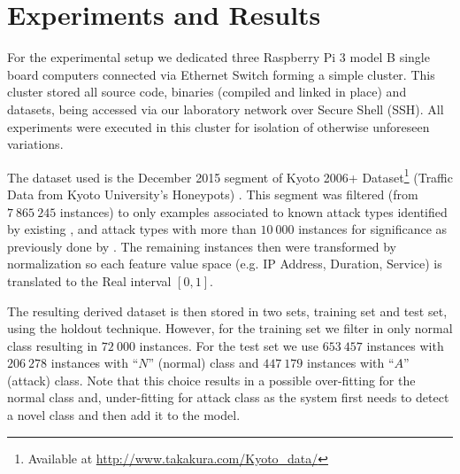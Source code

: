
\section{Experiments and Results}
\label{sec:experiments}

For the experimental setup we dedicated three Raspberry Pi 3 model B single
board computers connected via Ethernet Switch forming a simple cluster.
This cluster stored all source code, binaries (compiled and linked in place) and
datasets, being accessed via our laboratory network over Secure Shell (SSH).
All experiments were executed in this cluster for isolation of otherwise unforeseen
variations.

The dataset used is the December 2015 segment of
Kyoto 2006+ Dataset\footnote{Available at \url{http://www.takakura.com/Kyoto\_data/}}
(Traffic Data from Kyoto University's Honeypots)
\cite{Song2011}.
This segment was filtered (from $7\:865\:245$ instances) to only examples
associated to known attack types identified by existing \nids, and attack types
with more than $10\:000$ instances for significance as previously done by
\cite{Cassales2019a}.
The remaining instances then were transformed by normalization so
each feature value space (e.g. IP Address, Duration, Service) 
is translated to the Real interval $[0, 1]$.

The resulting derived dataset is then stored in two sets,
training set and test set, using the holdout technique.
However, for the training set we filter in only normal class
resulting in $72\:000$ instances.
For the test set we use $653\:457$ instances with
$206\:278$ instances with ``$N$'' (normal) class and
$447\:179$ instances with ``$A$'' (attack) class.
Note that this choice results in a possible over-fitting for the normal class and,
under-fitting for attack class as the system first needs to detect a novel class and
then add it to the model.



